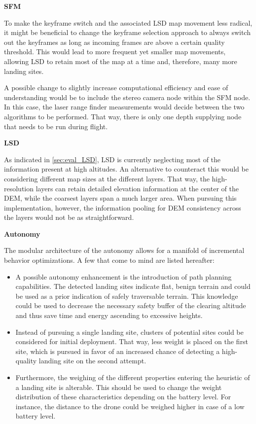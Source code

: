 \textbf{SFM}

To make the keyframe switch and the associated LSD map movement less radical, it might be beneficial to change the keyframe selection approach to always switch out the keyframes as long as incoming frames are above a certain quality threshold. This would lead to more frequent yet smaller map movements, allowing LSD to retain most of the map at a time and, therefore, many more landing sites.

A possible change to slightly increase computational efficiency and ease of understanding would be to include the stereo camera node within the SFM node. In this case, the laser range finder measurements would decide between the two algorithms to be performed. That way, there is only one depth supplying node that needs to be run during flight.

\textbf{LSD}

As indicated in \cref{sec:eval_LSD}, LSD is currently neglecting most of the information present at high altitudes. An alternative to counteract this would be considering different map sizes at the different layers. That way, the high-resolution layers can retain detailed elevation information at the center of the DEM, while the coarsest layers span a much larger area. When pursuing this implementation, however, the information pooling for DEM consistency across the layers would not be as straightforward.

\textbf{Autonomy}

The modular architecture of the autonomy allows for a manifold of incremental behavior optimizations. A few that come to mind are listed hereafter:

\begin{itemize}
    \item A possible autonomy enhancement is the introduction of path planning capabilities. The detected landing sites indicate flat, benign terrain and could be used as a prior indication of safely traversable terrain. This knowledge could be used to decrease the necessary safety buffer of the clearing altitude and thus save time and energy ascending to excessive heights.
    \item Instead of pursuing a single landing site, clusters of potential sites could be considered for initial deployment. That way, less weight is placed on the first site, which is pursued in favor of an increased chance of detecting a high-quality landing site on the second attempt.
    \item Furthermore, the weighing of the different properties entering the heuristic of a landing site is alterable. This should be used to change the weight distribution of these characteristics depending on the battery level. For instance, the distance to the drone could be weighed higher in case of a low battery level.
\end{itemize}
